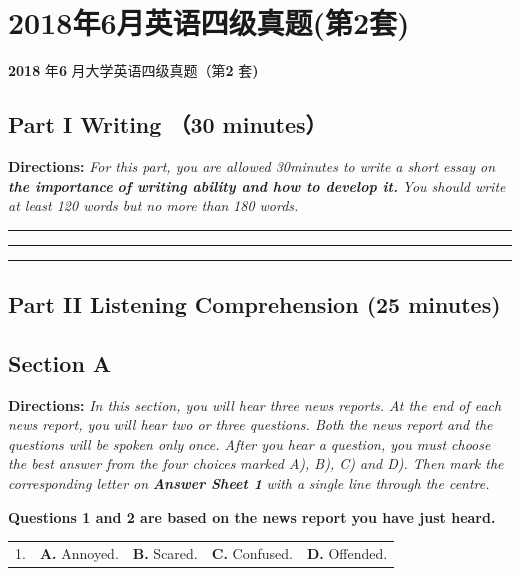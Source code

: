 \documentclass[UTF8,11pt]{ctexart}
\begin{document}
\section*{2018年6月英语四级真题(第2套)}
\textbf{2018} 年\textbf{6} 月大学英语四级真题（第\textbf{2} 套\textbf{)}


\subsection*{\textbf{Part I} \textbf{Writing} （\textbf{30 minutes}）}


\textbf{Directions:}\textit{ For this part, you are allowed 30minutes to write a short essay on}\textbf{\textit{ the importance}} \textbf{\textit{of writing ability and how to develop it.}}\textit{ You should write at least 120 words but no more than} \textit{180 words.} \par\noindent\rule{.95\linewidth}{.4pt}\par  \par\noindent\rule{.95\linewidth}{.4pt}\par  \par\noindent\rule{.95\linewidth}{.4pt}\par


\subsection*{\textbf{Part II} \textbf{Listening Comprehension} \textbf{(25 minutes)}}


\subsection*{\textbf{Section A}}


\textbf{Directions:}\textit{ In this section, you will hear three news reports. At the end of each news report, you} \textit{will hear two or three questions. Both the news report and the questions will be spoken only} \textit{once. After you hear a question, you must choose the best answer from the four choices} \textit{marked A), B), C) and D). Then mark the corresponding letter on}\textbf{\textit{ Answer Sheet 1}}\textit{ with a} \textit{single line through the centre.}


\textbf{Questions 1 and 2 are based on the news report you have just heard.}


\noindent\begin{tabularx}{\linewidth}{@{}lXXXX@{}}1. & \textbf{A.} Annoyed. & \textbf{B.} Scared. & \textbf{C.} Confused. & \textbf{D.} Offended.\\\end{tabularx}\par
\end{document}

